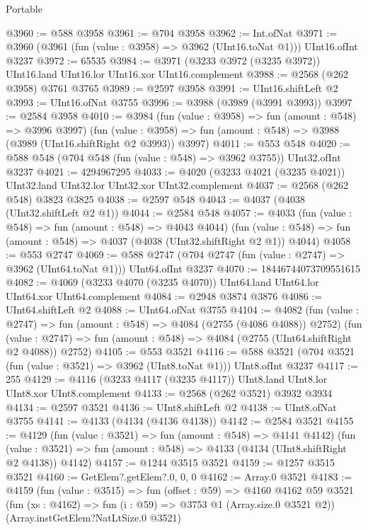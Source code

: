 \begin{lexlean}{Portable}
\begin{coremodule}
@3960 := @588 @3958
@3961 := @704 @3958
@3962 := Int.ofNat
@3971 := @3960 (@3961 (fun (value : @3958) => @3962 (UInt16.toNat @1))) UInt16.ofInt @3237
@3972 := 65535
@3984 := @3971 (@3233 @3972 (@3235 @3972)) UInt16.land UInt16.lor UInt16.xor UInt16.complement
@3988 := @2568 (@262 @3958) @3761 @3765
@3989 := @2597 @3958
@3991 := UInt16.shiftLeft @2
@3993 := UInt16.ofNat @3755
@3996 := @3988 (@3989 (@3991 @3993))
@3997 := @2584 @3958
@4010 := @3984
    (fun (value : @3958) => fun (amount : @548) => @3996 @3997)
    (fun (value : @3958) => fun (amount : @548) => @3988 (@3989 (UInt16.shiftRight @2 @3993)) @3997)
@4011 := @553 @548
@4020 := @588 @548 (@704 @548 (fun (value : @548) => @3962 @3755)) UInt32.ofInt @3237
@4021 := 4294967295
@4033 := @4020 (@3233 @4021 (@3235 @4021)) UInt32.land UInt32.lor UInt32.xor UInt32.complement
@4037 := @2568 (@262 @548) @3823 @3825
@4038 := @2597 @548
@4043 := @4037 (@4038 (UInt32.shiftLeft @2 @1))
@4044 := @2584 @548
@4057 := @4033
    (fun (value : @548) => fun (amount : @548) => @4043 @4044)
    (fun (value : @548) => fun (amount : @548) => @4037 (@4038 (UInt32.shiftRight @2 @1)) @4044)
@4058 := @553 @2747
@4069 := @588 @2747 (@704 @2747 (fun (value : @2747) => @3962 (UInt64.toNat @1))) UInt64.ofInt @3237
@4070 := 18446744073709551615
@4082 := @4069 (@3233 @4070 (@3235 @4070)) UInt64.land UInt64.lor UInt64.xor UInt64.complement
@4084 := @2948 @3874 @3876
@4086 := UInt64.shiftLeft @2
@4088 := UInt64.ofNat @3755
@4104 := @4082
    (fun (value : @2747) => fun (amount : @548) => @4084 (@2755 (@4086 @4088)) @2752)
    (fun (value : @2747) => fun (amount : @548) => @4084 (@2755 (UInt64.shiftRight @2 @4088)) @2752)
@4105 := @553 @3521
@4116 := @588 @3521 (@704 @3521 (fun (value : @3521) => @3962 (UInt8.toNat @1))) UInt8.ofInt @3237
@4117 := 255
@4129 := @4116 (@3233 @4117 (@3235 @4117)) UInt8.land UInt8.lor UInt8.xor UInt8.complement
@4133 := @2568 (@262 @3521) @3932 @3934
@4134 := @2597 @3521
@4136 := UInt8.shiftLeft @2
@4138 := UInt8.ofNat @3755
@4141 := @4133 (@4134 (@4136 @4138))
@4142 := @2584 @3521
@4155 := @4129
    (fun (value : @3521) => fun (amount : @548) => @4141 @4142)
    (fun (value : @3521) => fun (amount : @548) => @4133 (@4134 (UInt8.shiftRight @2 @4138)) @4142)
@4157 := @1244 @3515 @3521
@4159 := @1257 @3515 @3521
@4160 := GetElem?.getElem?.{0, 0, 0}
@4162 := Array.{0} @3521
@4183 := @4159
    (fun (value : @3515) =>
    fun (offset : @59) =>
    @4160
      @4162
      @59
      @3521
      (fun (xs : @4162) => fun (i : @59) => @3753 @1 (Array.size.{0} @3521 @2))
      (Array.instGetElem?NatLtSize.{0} @3521)

\end{coremodule}
\end{lexlean}
